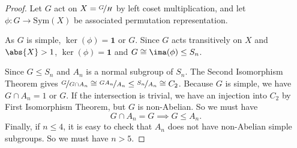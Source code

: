\begin{proof}
    Let \(G\) act on \(X = \nicefrac{G}{H}\) by left coset multiplication, and let \(\phi:G \to \mathrm{Sym}(X)\) be associated permutation representation.

    As \(G\) is simple, \(\ker(\phi)=\mathbf{1} \text{ or } G\). Since \(G\) acts transitively on \(X\) and \(\abs{X} >1\), \(\ker(\phi) = \textbf{1} \) and \(G \cong \ima(\phi)\leq S_n\).

    Since \(G \leq S_n\) and \(A_n\) is a normal subgroup of \(S_n\). The Second Isomorphism Theorem gives \( \nicefrac{G}{G\cap A_n}\cong \nicefrac{GA_n}{A_n} \leq \nicefrac{S_n}{A_n} \cong C_2 \). Because \(G\) is simple, we have \(G\cap A_{n} = 1 \text{ or } G\). If the intersection is trivial, we have an injection into \(C_2\) by First Isomorphism Theorem, but \(G\) is non-Abelian. So we must have
    \[
        G\cap A_n = G \implies G \leq A_n.
    \]
    Finally, if \(n\leq 4\), it is easy to check that \(A_n\) does not have non-Abelian simple subgroups. So we must have \(n > 5\).
\end{proof}